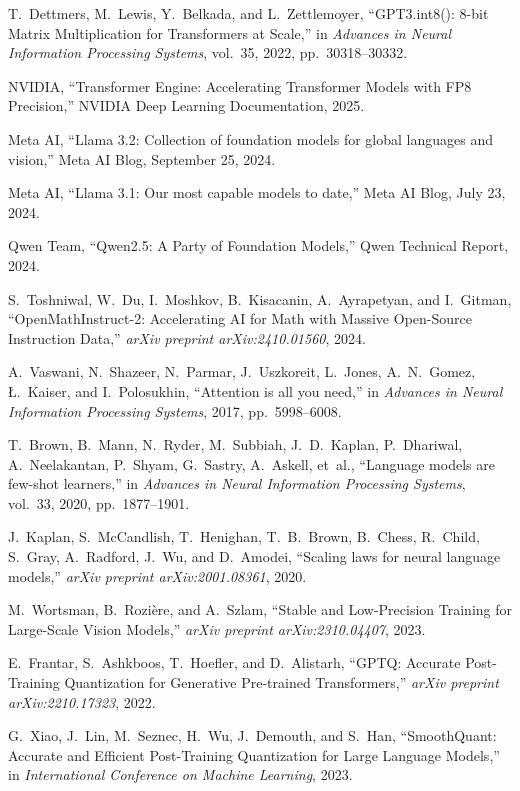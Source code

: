 \documentclass[conference]{IEEEtran}
\begin{document}
\begin{thebibliography}{40}
T.~Dettmers, M.~Lewis, Y.~Belkada, and L.~Zettlemoyer,
``GPT3.int8(): 8-bit Matrix Multiplication for Transformers at Scale,''
in \emph{Advances in Neural Information Processing Systems}, vol.~35, 2022, pp.~30318--30332.

NVIDIA,
``Transformer Engine: Accelerating Transformer Models with FP8 Precision,''
NVIDIA Deep Learning Documentation, 2025.

Meta AI, 
``Llama 3.2: Collection of foundation models for global languages and vision,'' 
Meta AI Blog, September 25, 2024.

Meta AI,
``Llama 3.1: Our most capable models to date,''
Meta AI Blog, July 23, 2024.

Qwen Team,
``Qwen2.5: A Party of Foundation Models,''
Qwen Technical Report, 2024.

S.~Toshniwal, W.~Du, I.~Moshkov, B.~Kisacanin, A.~Ayrapetyan, and I.~Gitman, 
``OpenMathInstruct-2: Accelerating AI for Math with Massive Open-Source Instruction Data,'' 
\emph{arXiv preprint arXiv:2410.01560}, 2024.

A.~Vaswani, N.~Shazeer, N.~Parmar, J.~Uszkoreit, L.~Jones, A.~N.~Gomez, {\L}.~Kaiser, and I.~Polosukhin,
``Attention is all you need,''
in \emph{Advances in Neural Information Processing Systems}, 2017, pp.~5998--6008.

T.~Brown, B.~Mann, N.~Ryder, M.~Subbiah, J.~D.~Kaplan, P.~Dhariwal, A.~Neelakantan, P.~Shyam, G.~Sastry, A.~Askell, et~al.,
``Language models are few-shot learners,''
in \emph{Advances in Neural Information Processing Systems}, vol.~33, 2020, pp.~1877--1901.

J.~Kaplan, S.~McCandlish, T.~Henighan, T.~B.~Brown, B.~Chess, R.~Child, S.~Gray, A.~Radford, J.~Wu, and D.~Amodei,
``Scaling laws for neural language models,''
\emph{arXiv preprint arXiv:2001.08361}, 2020.

M.~Wortsman, B.~Rozière, and A.~Szlam,
``Stable and Low-Precision Training for Large-Scale Vision Models,''
\emph{arXiv preprint arXiv:2310.04407}, 2023.

E.~Frantar, S.~Ashkboos, T.~Hoefler, and D.~Alistarh,
``GPTQ: Accurate Post-Training Quantization for Generative Pre-trained Transformers,''
\emph{arXiv preprint arXiv:2210.17323}, 2022.

G.~Xiao, J.~Lin, M.~Seznec, H.~Wu, J.~Demouth, and S.~Han,
``SmoothQuant: Accurate and Efficient Post-Training Quantization for Large Language Models,''
in \emph{International Conference on Machine Learning}, 2023.

\end{thebibliography}
\end{document}

